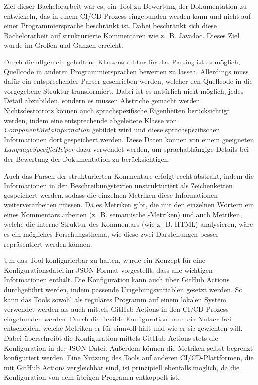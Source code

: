 Ziel dieser Bachelorarbeit war es, ein Tool zu Bewertung der Dokumentation zu entwickeln, das in einem \ac{CI/CD}-Prozess eingebunden werden kann und nicht auf einer Programmiersprache beschränkt ist. Dabei beschränkt sich diese Bachelorarbeit auf strukturierte Kommentaren wie z.~B. Javadoc. Dieses Ziel wurde im Großen und Ganzen erreicht.

Durch die allgemein gehaltene Klassenstruktur für das Parsing ist es möglich, Quellcode in anderen Programmiersprachen bewerten zu lassen. Allerdings muss dafür ein entsprechender Parser geschrieben werden, welcher den Quellcode in die vorgegebene Struktur transformiert. Dabei ist es natürlich nicht möglich, jedes Detail abzubilden, sondern es müssen Abstriche gemacht werden. Nichtsdestotrotz können auch sprachspezifische Eigenheiten berücksichtigt werden, indem eine entsprechende abgeleitete Klasse von \textit{ComponentMetaInformation} gebildet wird und diese sprachspezifischen Informationen dort gespeichert werden. Diese Daten können von einem geeigneten \textit{LanguageSpecificHelper} dazu verwendet werden, um sprachabhängige Details bei der Bewertung der Dokumentation zu berücksichtigen. 

Auch das Parsen der strukturierten Kommentare erfolgt recht abstrakt, indem  die Informationen in den Beschreibungstexten unstrukturiert als Zeichenketten gespeichert werden, sodass die einzelnen Metriken diese Informationen weiterverarbeiten müssen. Da es Metriken gibt, die mit den einzelnen Wörtern ein eines Kommentars arbeiten (z.~B. semantische -Metriken) und auch Metriken, welche die interne Struktur des Kommentars (wie z.~B. \ac{HTML}) analysieren, wäre es ein mögliches Forschungsthema, wie diese zwei Darstellungen besser repräsentiert werden können. 

Um das Tool konfigurierbar zu halten, wurde ein Konzept für eine Konfigurationsdatei im \ac{JSON}-Format vorgestellt, dass alle wichtigen Informationen enthält. Die Konfiguration kann auch über GitHub Actions durchgeführt werden, indem passende Umgebungsvariablen gesetzt werden.  So kann das Tools sowohl als reguläres Programm auf einem lokalen System verwendet werden als auch mittels GitHub Actions in den \ac{CI/CD}-Prozess eingebunden werden. Durch die flexible Konfiguration kann ein Nutzer frei entscheiden, welche Metriken er für sinnvoll hält und wie er sie gewichten will. Dabei überschreibt die Konfiguration mittels GitHub Actions stets die Konfiguration in der \ac{JSON}-Datei. Außerdem können die Metriken selbst begrenzt konfiguriert werden. Eine Nutzung des Tools auf anderen \ac{CI/CD}-Plattformen, die mit GitHub Actions vergleichbar sind,  ist prinzipiell ebenfalls möglich, da die Konfiguration von dem  übrigen Programm entkoppelt ist.

